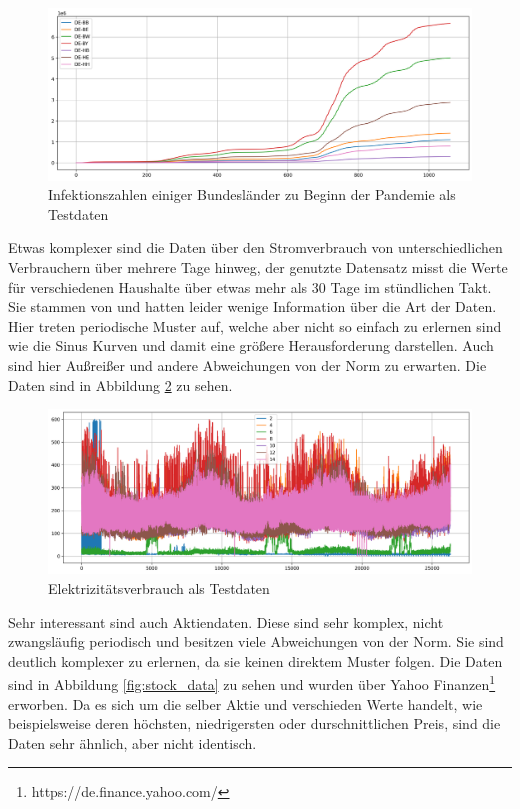 \begin{figure}[ht]
    \centering
    \includegraphics[width=1\textwidth]{includes/figures/graphs/corona_test_cases.png}
    \caption{Infektionszahlen einiger Bundesländer zu Beginn der Pandemie als Testdaten}
    \label{fig:corona_data}
\end{figure}

Etwas komplexer sind die Daten über den Stromverbrauch von unterschiedlichen Verbrauchern über mehrere Tage hinweg, der genutzte Datensatz misst die Werte für verschiedenen Haushalte über etwas mehr als 30 Tage im stündlichen Takt. Sie stammen von \cite{longterm99:online} und hatten leider wenige Information über die Art der Daten.
Hier treten periodische Muster auf, welche aber nicht so einfach zu erlernen sind wie die Sinus Kurven und damit eine größere Herausforderung darstellen.
Auch sind hier Außreißer und andere Abweichungen von der Norm zu erwarten. Die Daten sind in Abbildung \ref{fig:electric_data} zu sehen.

\begin{figure}[ht]
    \centering
    \includegraphics[width=1\textwidth]{includes/figures/graphs/electricity.png}
    \caption{Elektrizitätsverbrauch als Testdaten}
    \label{fig:electric_data}
\end{figure}



Sehr interessant sind auch Aktiendaten. Diese sind sehr komplex, nicht zwangsläufig periodisch und besitzen viele Abweichungen von der Norm. Sie sind deutlich komplexer zu erlernen, da sie keinen direktem Muster folgen.
Die Daten sind in Abbildung \ref{fig:stock_data} zu sehen und wurden über Yahoo Finanzen\footnote{https://de.finance.yahoo.com/} erworben. Da es sich um die selber Aktie und verschieden Werte handelt, wie beispielsweise deren höchsten, niedrigersten oder durschnittlichen Preis, sind die Daten sehr ähnlich, aber nicht identisch.

